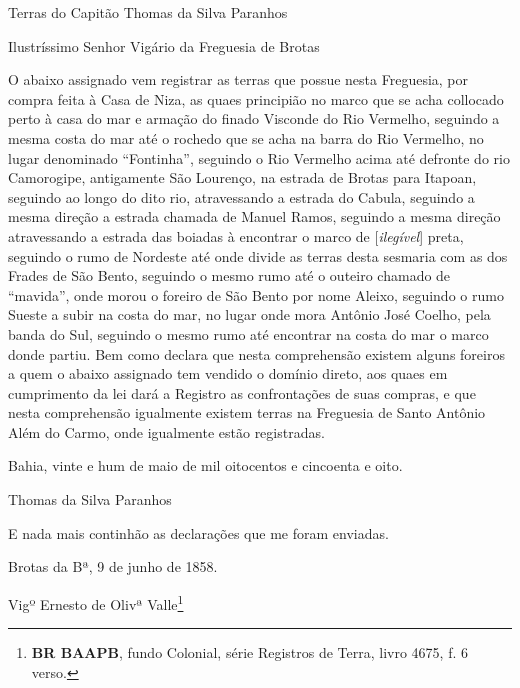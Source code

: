 \begin{citacao}
Terras do Capitão Thomas da Silva Paranhos

Ilustríssimo Senhor Vigário da Freguesia de Brotas

O abaixo assignado vem registrar as terras que possue nesta Freguesia, por compra feita à Casa de Niza, as quaes principião no marco que se acha collocado perto à casa do mar e armação do finado Visconde do Rio Vermelho, seguindo a mesma costa do mar até o rochedo que se acha na barra do Rio Vermelho, no lugar denominado ``Fontinha'', seguindo o Rio Vermelho acima até defronte do rio Camorogipe, antigamente São Lourenço, na estrada de Brotas para Itapoan, seguindo ao longo do dito rio, atravessando a estrada do Cabula, seguindo a mesma direção a estrada chamada de Manuel Ramos, seguindo a mesma direção atravessando a estrada das boiadas à encontrar o marco de [\textit{ilegível}] preta, seguindo o rumo de Nordeste até onde divide as terras desta sesmaria com as dos Frades de São Bento, seguindo o mesmo rumo até o outeiro chamado de ``mavida'', onde morou o foreiro de São Bento por nome Aleixo, seguindo o rumo Sueste a subir na costa do mar, no lugar onde mora Antônio José Coelho, pela banda do Sul, seguindo o mesmo rumo até encontrar na costa do mar o marco donde partiu. Bem como declara que nesta comprehensão existem alguns foreiros a quem o abaixo assignado tem vendido o domínio direto, aos quaes em cumprimento da lei dará a Registro as confrontações de suas compras, e que nesta comprehensão igualmente existem terras na Freguesia de Santo Antônio Além do Carmo, onde igualmente estão registradas.

Bahia, vinte e hum de maio de mil oitocentos e cincoenta e oito.

Thomas da Silva Paranhos

E nada mais continhão as declarações que me foram enviadas.

Brotas da Bª, 9 de junho de 1858.

Vigº Ernesto de Olivª Valle\footnote{\textbf{BR BAAPB}, fundo Colonial, série Registros de Terra, livro 4675, f. 6 verso.}
\end{citacao}

